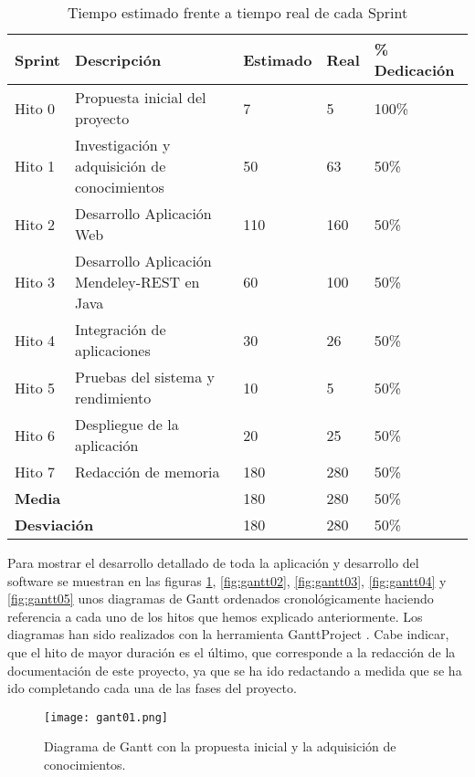 \begin{table}[!hbt]
	\begin{center}
		\begin{tabular}{|p{2cm}|p{5cm}|p{2.5cm}|p{2cm}|p{1.5cm}|}
			\hline
			\textbf{Sprint} & \textbf{Descripción} & \textbf{Estimado} & \textbf{Real} & \textbf{\% Dedicación}\\
			\hline
			Hito 0 & Propuesta inicial del proyecto & 7 & 5 & 100\%\\
			\hline
			Hito 1 & Investigación y adquisición de conocimientos & 50 & 63 & 50\%\\
			\hline
			Hito 2 & Desarrollo Aplicación Web & 110 & 160 & 50\%\\
			\hline
			Hito 3 & Desarrollo Aplicación Mendeley-REST en Java & 60 & 100 & 50\%\\
			\hline
			Hito 4 & Integración de aplicaciones & 30 & 26 & 50\%\\
			\hline
			Hito 5 & Pruebas del sistema y rendimiento & 10 & 5 & 50\%\\
			\hline
			Hito 6 & Despliegue de la aplicación & 20 & 25 & 50\%\\
			\hline
			Hito 7 & Redacción de memoria & 180 & 280 & 50\%\\
			\hline
			\multicolumn{2}{|l|}{\textbf{Media}} & 180 & 280 & 50\%\\
			\hline
			\multicolumn{2}{|l|}{\textbf{Desviación}} & 180 & 280 & 50\%\\
			\hline
		\end{tabular}
		\caption{Tiempo estimado frente a tiempo real de cada Sprint}
		\label{table:hitos}
	\end{center}
\end{table}

Para mostrar el desarrollo detallado de toda la aplicación y desarrollo del software se muestran en las figuras \ref{fig:gantt01}, \ref{fig:gantt02}, \ref{fig:gantt03}, \ref{fig:gantt04} y \ref{fig:gantt05} unos diagramas de Gantt ordenados cronológicamente haciendo referencia a cada uno de los hitos que hemos explicado anteriormente. Los diagramas han sido realizados con la herramienta GanttProject \cite{gantt15}. Cabe indicar, que el hito de mayor duración es el último, que corresponde a la redacción de la documentación de este proyecto, ya que se ha ido redactando a medida que se ha ido completando cada una de las fases del proyecto.\\

\begin{figure}[h!]
	\begin{center}
		\texttt{[image: gant01.png]}
		\caption{Diagrama de Gantt con la propuesta inicial y la adquisición de conocimientos.}
		\label{fig:gantt01}
	\end{center}
\end{figure}

